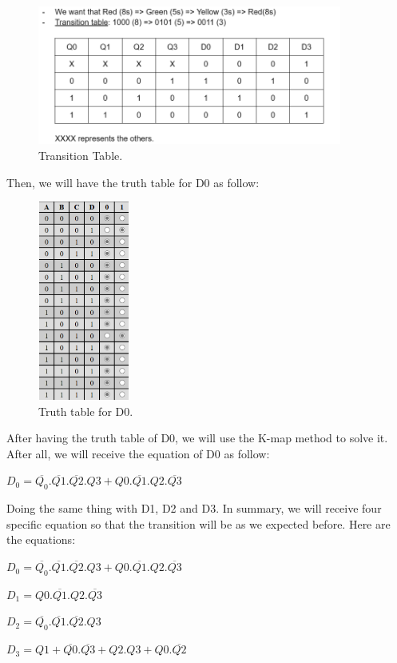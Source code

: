 \documentclass{article}
\begin{document}
\begin{figure}[h]
    \centering
    \includegraphics[width=10cm]{Pic/Proteus/transition table.png}
    \caption{Transition Table.}
    \label{fig:enter-label}
\end{figure}
\newpage
Then, we will have the truth table for D0 as follow:\par

\begin{figure}[h]
    \centering
    \includegraphics[width=3cm]{Pic/Proteus/Truth table D0.png}
    \caption{Truth table for D0.}
    \label{fig:enter-label}
\end{figure}

After having the truth table of D0, we will use the K-map method to solve it. After all, we will receive the equation of D0 as follow:\par
\begin{center}
    $D_0 = \overline{Q_0}.\overline{Q1}.\overline{Q2}.Q3 + Q0.\overline{Q1}.Q2.\overline{Q3}$
\end{center}

Doing the same thing with D1, D2 and D3. In summary, we will receive four specific equation so that the transition will be as we expected before. Here are the equations:\par
\vspace{10pt}
$D_0 = \overline{Q_0}.\overline{Q1}.\overline{Q2}.Q3 + Q0.\overline{Q1}.Q2.\overline{Q3}$\par
$D_1 = Q0.\overline{Q1}.Q2.\overline{Q3}$\par
$D_2 = \overline{Q_0}.\overline{Q1}.\overline{Q2}.Q3$\par
$D_3 = Q1 + \overline{Q0}.\overline{Q3} + Q2.Q3 + Q0.\overline{Q2}$
\vspace{10pt}
\end{document}
